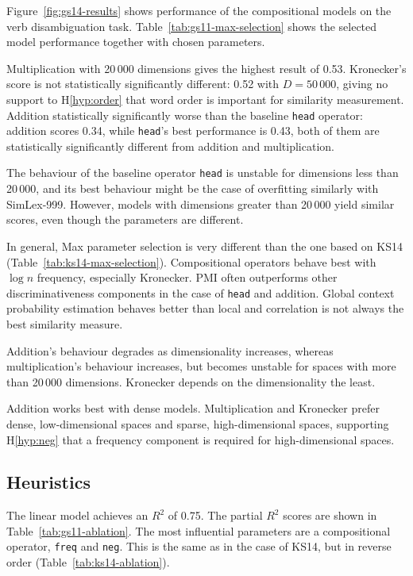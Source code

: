 

Figure~\ref{fig:gs14-results} shows performance of the compositional models on the verb disambiguation task. Table~\ref{tab:gs11-max-selection} shows the selected model performance together with chosen parameters.

Multiplication with 20\,000 dimensions gives the highest result of 0.53. Kronecker's score is not statistically significantly different: 0.52 with $D = 50\,000$, giving no support to H\ref{hyp:order} that word order is important for similarity measurement. Addition statistically significantly worse than the baseline \texttt{head} operator: addition scores 0.34, while \texttt{head}'s best performance is 0.43, both of them are statistically significantly different from addition and multiplication.

The behaviour of the baseline operator \texttt{head} is unstable for dimensions less than 20\,000, and its best behaviour might be the case of overfitting similarly with SimLex-999. However, models with dimensions greater than 20\,000 yield similar scores, even though the parameters are different.

In general, Max parameter selection is very different than the one based on KS14 (Table~\ref{tab:ks14-max-selection}). Compositional operators behave best with $\log n$ frequency, especially Kronecker. PMI often outperforms other discriminativeness components in the case of \texttt{head} and addition. Global context probability estimation behaves better than local and correlation is not always the best similarity measure.

Addition's behaviour degrades as dimensionality increases, whereas multiplication's behaviour increases, but becomes unstable for spaces with more than 20\,000 dimensions. Kronecker depends on the dimensionality the least.

Addition works best with dense models. Multiplication and Kronecker prefer dense, low-dimensional spaces and sparse, high-dimensional spaces, supporting H\ref{hyp:neg} that a frequency component is required for high-dimensional spaces.

\subsection{Heuristics}
\label{sec:heuristics-gs11}

The linear model achieves an $R^2$ of 0.75. The partial $R^2$ scores are shown in Table~\ref{tab:gs11-ablation}. The most influential parameters are a compositional operator, \texttt{freq} and \texttt{neg}. This is the same as in the case of KS14, but in reverse order (Table~\ref{tab:ks14-ablation}).

